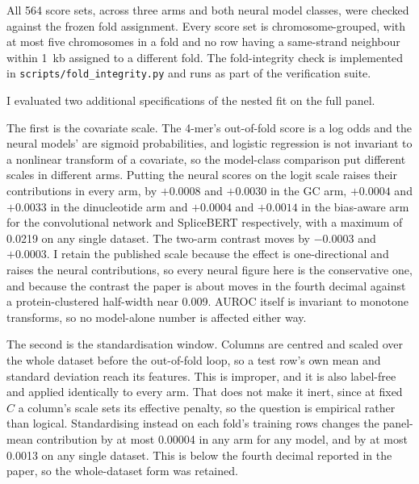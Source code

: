 All 564 score sets, across three arms and both neural model classes, were checked against the
frozen fold assignment. Every score set is chromosome-grouped, with at most five chromosomes in
a fold and no row having a same-strand neighbour within 1~kb assigned to a different fold. The
fold-integrity check is implemented in \texttt{scripts/fold\_integrity.py} and runs as part of
the verification suite.

I evaluated two additional specifications of the nested fit on the full panel.

The first is the covariate scale. The 4-mer's out-of-fold score is a log odds and the neural
models' are sigmoid probabilities, and logistic regression is not invariant to a nonlinear
transform of a covariate, so the model-class comparison put different scales in different arms.
Putting the neural scores on the logit scale raises their contributions in every arm, by
$+0.0008$ and $+0.0030$ in the GC arm, $+0.0004$ and $+0.0033$ in the dinucleotide arm and
$+0.0004$ and $+0.0014$ in the bias-aware arm for the convolutional network and SpliceBERT
respectively, with a maximum of 0.0219 on any single dataset. The two-arm contrast moves by
$-0.0003$ and $+0.0003$. I retain the published scale because the effect is one-directional and
raises the neural contributions, so every neural figure here is the conservative one, and
because the contrast the paper is about moves in the fourth decimal against a
protein-clustered half-width near 0.009. AUROC itself is invariant to monotone transforms, so no
model-alone number is affected either way.

The second is the standardisation window. Columns are centred and scaled over the whole dataset
before the out-of-fold loop, so a test row's own mean and standard deviation reach its features.
This is improper, and it is also label-free and applied identically to every arm. That does not
make it inert, since at fixed $C$ a column's scale sets its effective penalty, so the question
is empirical rather than logical.
Standardising instead on each fold's training rows changes the panel-mean contribution by at
most 0.00004 in any arm for any model, and by at most 0.0013 on any single dataset. This is
below the fourth decimal reported in the paper, so the whole-dataset form was retained.


